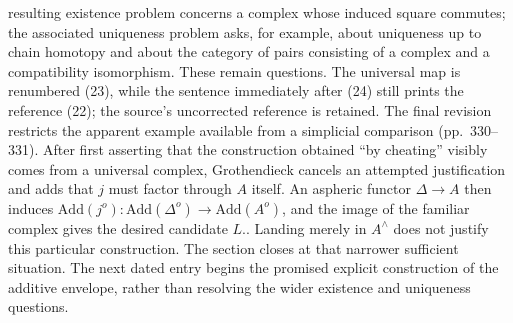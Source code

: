 \documentclass[10pt,oneside]{book}
\begin{document}
resulting existence problem concerns a complex whose induced square commutes; the associated uniqueness problem asks, for example, about uniqueness up to chain homotopy and about the category of pairs consisting of a complex and a compatibility isomorphism. These remain questions. The universal map is renumbered (23), while the sentence immediately after (24) still prints the reference (22); the source's uncorrected reference is retained. The final revision restricts the apparent example available from a simplicial comparison (pp.~330--331). After first asserting that the construction obtained ``by cheating'' visibly comes from a universal complex, Grothendieck cancels an attempted justification and adds that $j$ must factor through $A$ itself. An aspheric functor $\Delta\to A$ then induces $\mathrm{Add}(j^o):\mathrm{Add}(\Delta^o)\to\mathrm{Add}(A^o)$, and the image of the familiar complex gives the desired candidate $L.$. Landing merely in $A^{\wedge}$ does not justify this particular construction. The section closes at that narrower sufficient situation. The next dated entry begins the promised explicit construction of the additive envelope, rather than resolving the wider existence and uniqueness questions.
\end{document}
